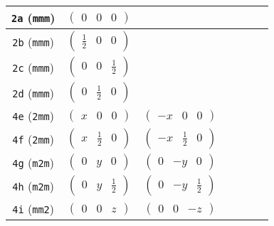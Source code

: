 \documentclass[fleqn,9pt,landscape]{jsarticle}
\begin{document}
\begin{center}
\begin{longtable}{ccccccc}
{\tt 2a} ({\tt mmm}) & $ \begin{pmatrix} 0 & 0 & 0 \end{pmatrix} $ & $  $ & $  $ & $  $ & $  $ & $  $ \\ \hline
{\tt 2b} ({\tt mmm}) & $ \begin{pmatrix} \frac{1}{2} & 0 & 0 \end{pmatrix} $ & $  $ & $  $ & $  $ & $  $ & $  $ \\ \hline
{\tt 2c} ({\tt mmm}) & $ \begin{pmatrix} 0 & 0 & \frac{1}{2} \end{pmatrix} $ & $  $ & $  $ & $  $ & $  $ & $  $ \\ \hline
{\tt 2d} ({\tt mmm}) & $ \begin{pmatrix} 0 & \frac{1}{2} & 0 \end{pmatrix} $ & $  $ & $  $ & $  $ & $  $ & $  $ \\ \hline
{\tt 4e} ({\tt 2mm}) & $ \begin{pmatrix} x & 0 & 0 \end{pmatrix} $ & $ \begin{pmatrix} - x & 0 & 0 \end{pmatrix} $ & $  $ & $  $ & $  $ & $  $ \\ \hline
{\tt 4f} ({\tt 2mm}) & $ \begin{pmatrix} x & \frac{1}{2} & 0 \end{pmatrix} $ & $ \begin{pmatrix} - x & \frac{1}{2} & 0 \end{pmatrix} $ & $  $ & $  $ & $  $ & $  $ \\ \hline
{\tt 4g} ({\tt m2m}) & $ \begin{pmatrix} 0 & y & 0 \end{pmatrix} $ & $ \begin{pmatrix} 0 & - y & 0 \end{pmatrix} $ & $  $ & $  $ & $  $ & $  $ \\ \hline
{\tt 4h} ({\tt m2m}) & $ \begin{pmatrix} 0 & y & \frac{1}{2} \end{pmatrix} $ & $ \begin{pmatrix} 0 & - y & \frac{1}{2} \end{pmatrix} $ & $  $ & $  $ & $  $ & $  $ \\ \hline
{\tt 4i} ({\tt mm2}) & $ \begin{pmatrix} 0 & 0 & z \end{pmatrix} $ & $ \begin{pmatrix} 0 & 0 & - z \end{pmatrix} $ & $  $ & $  $ & $  $ & $  $ \\ \hline

\end{longtable}
\end{center}
\end{document}
